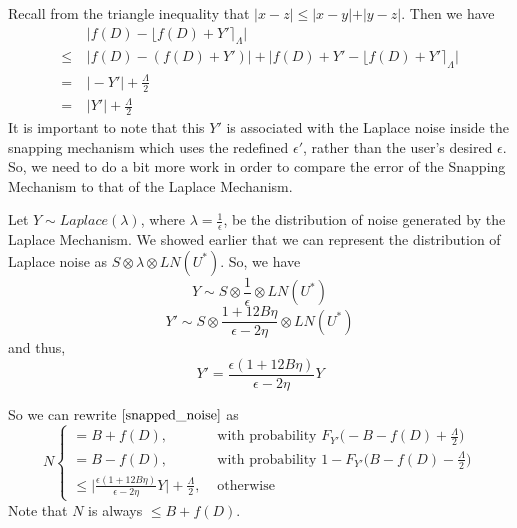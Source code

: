 \documentclass[11pt]{scrartcl} %
\begin{document}
Recall from the triangle inequality that $\vert x-z \vert \leq \vert x-y \vert + \vert y-z \vert$. Then we have
\begin{align}
	                  &\big\vert f(D) - \lfloor f(D) + Y' \rceil_{\Lambda} \big\vert \nonumber \\
    \leq \hspace{3pt} &\big\vert f(D) - (f(D) + Y') \big\vert + \big\vert f(D) + Y' - \lfloor f(D) + Y' \rceil_{\Lambda} \big\vert \nonumber \\
       = \hspace{3pt} &\vert -Y' \vert + \frac{\Lambda}{2} \nonumber \\
	   = \hspace{3pt} &\vert Y' \vert + \frac{\Lambda}{2} \nonumber
\end{align}
It is important to note that this $Y'$ is associated with the Laplace noise inside the snapping mechanism which uses the redefined $\epsilon'$, rather than the user's desired $\epsilon$. So, we need to do a bit more work in order to compare the error of the Snapping Mechanism to that of the Laplace Mechanism. \newline

Let $Y \sim Laplace(\lambda)$, where $\lambda = \frac{1}{\epsilon}$, be the distribution of noise generated by the Laplace Mechanism. We showed earlier that we can represent the distribution of Laplace noise as $S \otimes \lambda \otimes LN(U^*)$. So, we have
\[ Y \sim S \otimes \frac{1}{\epsilon} \otimes LN(U^*) \]
\[ Y' \sim S \otimes \frac{1 + 12B\eta}{\epsilon - 2\eta} \otimes LN(U^*) \]
and thus,
\[ Y' = \frac{\epsilon(1 + 12B\eta)}{\epsilon - 2\eta}Y \]

So we can rewrite $\eqref{snapped_noise}$ as
\begin{equation}
	\label{snapped_noise_rewrite}
	N
		\begin{cases}
			= B + f(D), &\text{ with probability } F_{Y'} \big( -B - f(D) + \frac{\Lambda}{2} \big)  \\
			= B - f(D), &\text{ with probability } 1 - F_{Y'} \big( B - f(D) - \frac{\Lambda}{2} \big)  \\
			\leq \big\vert \frac{\epsilon(1 + 12B\eta)}{\epsilon - 2\eta}Y  \big\vert + \frac{\Lambda}{2}, &\text{ otherwise }
		\end{cases}
\end{equation}
Note that $N$ is always $\leq B + f(D)$.
\end{document}
